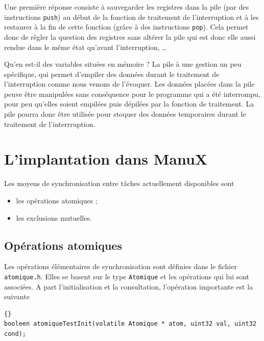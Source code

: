    Une première réponse consiste à sauvegarder les registres dans la
pile (par des instructions \lstinline!push!) au début de la fonction
de traitement de l'interruption et à les restaurer à la fin de cette
fonction (grâce à des instructions \lstinline!pop!). Cela permet donc
de rêgler la question des registres sans altérer la pile qui est donc
elle aussi rendue dans le même état qu'avant l'interruption, \ldots

   Qu'en est-il des variables situées en mémoire ? La pile à une
gestion un peu spécifique, qui permet d'empiler des données durant le
traitement de l'interruption comme nous venons de l'évoquer. Les
données placées dans la pile peuve être manipulées sans conséquence
pour le programme qui a été interrompu, pour peu qu'elles soient
empilées puis dépilées par la fonction de traitement. La pile pourra
donc être utilisée pour stoquer des données temporaires durant le
traitement de l'interrruption.

\section{L'implantation dans ManuX}

   Les moyens de synchronisation entre tâches actuellement disponibles
sont 

\begin{itemize}
   \item les opérations atomiques ;
   \item les exclusions mutuelles.
\end{itemize}

\subsection{Opérations atomiques}

   Les opérations élémentaires de synchronisation sont définies dans
le fichier {\tt atomique.h}. Elles se basent sur le type
\lstinline!Atomique! et les opérations qui lui sont associées. A part
l'initialisation et la consultation, l'opération importante est la
suivante

\begin{lstlisting}{}
booleen atomiqueTestInit(volatile Atomique * atom, uint32 val, uint32 cond);
\end{lstlisting}

